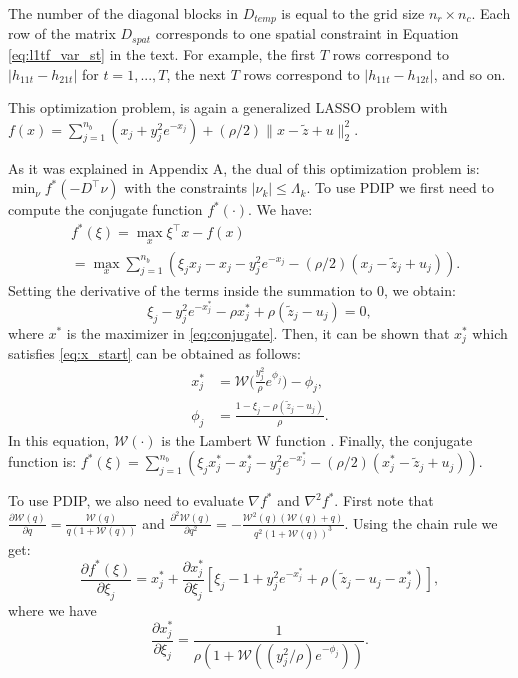 \documentclass[letterpaper]{article} %
\begin{document}
The number of the diagonal blocks in $D_{temp}$ is equal to the grid
size $n_r \times n_c$. Each row of the matrix $D_{spat}$ corresponds
to one spatial constraint in Equation \eqref{eq:l1tf_var_st} in the
text. For example, the first $T$ rows correspond to
$|h_{11t}-h_{21t}|$ for $t=1,...,T$, the next $T$ rows correspond to
$|h_{11t}-h_{12t}|$, and so on.  


This optimization problem, is again a generalized LASSO problem with
$f(x)=\sum_{j=1}^{n_b} (x_j + y_j^2e^{-x_j}) + (\rho/2) \lVert
x-\tilde{z} + u \lVert_2^2$.  

As it was explained in Appendix A, the dual of this optimization
problem is: $\min_\nu f^*(-D^\top\nu)$ with the constraints $|\nu_k|
\le \Lambda_k$. To use PDIP we first need to compute the conjugate
function $f^*(\cdot)$. We have: 
\begin{equation}
\begin{aligned}
&f^*(\xi)  = \max_x  \xi^\top x - f(x)\\
& =  \max_x \sum_{j=1}^{n_b} (\xi_jx_j - x_j - y_j^2e^{-x_j} -
(\rho/2)(x_j-\tilde{z}_j+u_j)). 
\end{aligned}
\label{eq:conjugate}
\end{equation}
Setting the derivative of the terms inside the summation to 0, we obtain:
\begin{equation}
\xi_j-y_j^2e^{-x_j^*}-\rho x_j^* + \rho (\tilde{z}_j-u_j)=0,
\label{eq:x_start}
\end{equation}
where $x^*$ is the maximizer in \ref{eq:conjugate}. Then, it
can be shown that $x_j^*$ which satisfies \eqref{eq:x_start} can be
obtained as follows: 
\begin{align}
x^*_j & = \mathscr{W}\bigg(\frac{y_j^2}{\rho} e^{\phi_j} \bigg) - \phi_j, \\
\phi_j & =\frac{1-\xi_j-\rho(\tilde{z}_j-u_j)}{\rho}.
\end{align}
In this equation, $\mathscr{W}(\cdot)$ is the Lambert W function \cite{corless_lambertw_1996}. Finally, the conjugate function is: $f^*(\xi) = \sum_{j=1}^{n_b} (\xi_jx^*_j - x^*_j - y_j^2e^{-x^*_j} - (\rho/2)(x^*_j-\tilde{z}_j+u_j))$.

To use PDIP, we also need to evaluate $\nabla f^*$ and $\nabla^2 f^*$. First note that $\frac{\partial \mathscr{W}(q)}{\partial q} = \frac{\mathscr{W}(q)}{q(1+\mathscr{W}(q))}$ and $\frac{\partial^2 \mathscr{W}(q)}{\partial q^2} = - \frac{\mathscr{W}^2(q)(\mathscr{W}(q)+q)}{q^2(1+\mathscr{W}(q))^3}$. Using the chain rule we get:
\begin{equation}
\frac{\partial f^*(\xi)}{\partial \xi_j}  =  x^*_j  + \frac{\partial
  x^*_j}{\partial \xi_j} \left[ \xi_j -1 + y_j^2 e^{-x_j^*} + \rho
  (\tilde{z}_j - u_j - x_j^*) \right], 
\label{eq:d_f*_start}
\end{equation}
where we have
\begin{equation}
\frac{\partial x_j^*}{\partial \xi_j}  = \frac{1}{\rho(1+\mathscr{W}((y_j^2/\rho) e^{-\phi_j} ))}.
\label{eq:d_x*_start}
\end{equation}
\end{document}
